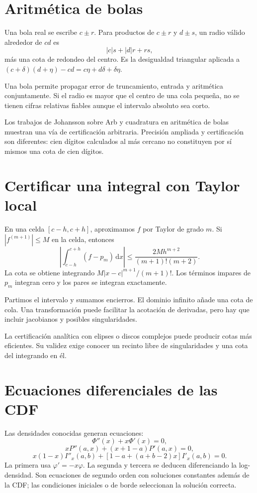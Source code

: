 \documentclass[11pt,a4paper]{article}
\newcommand{\dd}{\,\mathrm d}
\theoremstyle{definition}
\newcommand{\ph}{\varphi}
\begin{document}
\section{Aritmética de bolas}
Una bola real se escribe $c\pm r$. Para productos de $c\pm r$ y $d\pm s$, un radio válido alrededor de $cd$ es
\[
|c|s+|d|r+rs,
\]
más una cota de redondeo del centro. Es la desigualdad triangular aplicada a
$(c+\delta)(d+\eta)-cd=c\eta+d\delta+\delta\eta$.

Una bola permite propagar error de truncamiento, entrada y aritmética conjuntamente. Si el radio es mayor que el centro de una cola pequeña, no se tienen cifras relativas fiables aunque el intervalo absoluto sea corto.

Los trabajos de Johansson sobre Arb y cuadratura en aritmética de bolas muestran una vía de certificación arbitraria. Precisión ampliada y certificación son diferentes: cien dígitos calculados al más cercano no constituyen por sí mismos una cota de cien dígitos.

\section{Certificar una integral con Taylor local}
En una celda $[c-h,c+h]$, aproximamos $f$ por Taylor de grado $m$. Si $|f^{(m+1)}|\le M$ en la celda, entonces
\[
\left|\int_{c-h}^{c+h}(f-p_m)\dd x\right|
\le\frac{2Mh^{m+2}}{(m+1)!(m+2)}.
\]
La cota se obtiene integrando $M|x-c|^{m+1}/(m+1)!$. Los términos impares de $p_m$ integran cero y los pares se integran exactamente.

Partimos el intervalo y sumamos encierros. El dominio infinito añade una cota de cola. Una transformación puede facilitar la acotación de derivadas, pero hay que incluir jacobianos y posibles singularidades.

La certificación analítica con elipses o discos complejos puede producir cotas más eficientes. Su validez exige conocer un recinto libre de singularidades y una cota del integrando en él.

\section{Ecuaciones diferenciales de las CDF}
Las densidades conocidas generan ecuaciones:
\[
\Phi''(x)+x\Phi'(x)=0,
\]
\[
xP''(a,x)+(x+1-a)P'(a,x)=0,
\]
\[
x(1-x)I''_x(a,b)+[1-a+(a+b-2)x]I'_x(a,b)=0.
\]
La primera usa $\ph'=-x\ph$. La segunda y tercera se deducen diferenciando la log-densidad. Son ecuaciones de segundo orden con soluciones constantes además de la CDF; las condiciones iniciales o de borde seleccionan la solución correcta.
\end{document}
